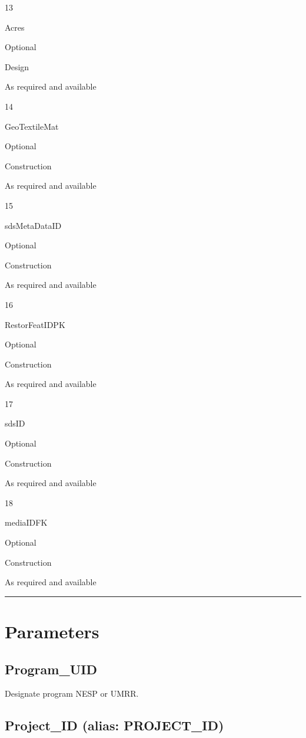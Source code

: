 \documentclass[
  letterpaper,
  DIV=11,
  numbers=noendperiod]{scrreprt}
\begin{document}
13

Acres

Optional

Design

As required and available

14

GeoTextileMat

Optional

Construction

As required and available

15

sdsMetaDataID

Optional

Construction

As required and available

16

RestorFeatIDPK

Optional

Construction

As required and available

17

sdsID

Optional

Construction

As required and available

18

mediaIDFK

Optional

Construction

As required and available

\begin{center}\rule{0.5\linewidth}{0.5pt}\end{center}

\section{Parameters}\label{parameters-12}

\subsection{Program\_UID}\label{program_uid-12}

Designate program NESP or UMRR.

\subsection{Project\_ID (alias:
PROJECT\_ID)}\label{project_id-alias-project_id-12}
\end{document}

